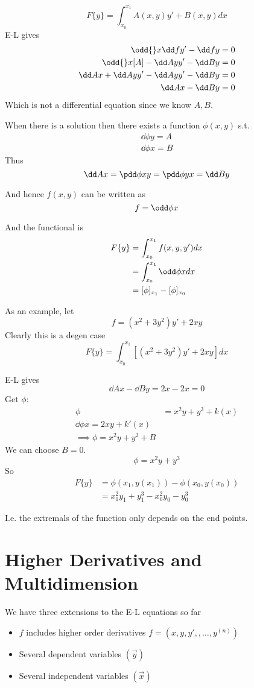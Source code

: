 \documentclass{E:/Documents/Latex/myassignment}
\begin{document}
\[F \{y\} = \int_{x_0}^{x_1} A(x,y) y' + B(x,y) dx\]
E-L gives
\begin{align*}
	\odd{}x \dd f{y'} - \dd fy = 0\\
	\odd{}x [A] - \dd Ay y'- \dd By =0\\
	\dd Ax + \dd Ay y' - \dd Ay y' - \dd By = 0\\
	\dd Ax - \dd By = 0
\end{align*}
Which is not a differential equation since we know $A, B$.


When there is a solution then there exists a function $\phi(x,y)$ s.t.
\begin{align*}
	\dd\phi y = A\\
	\dd\phi x = B
\end{align*}
Thus
\[\dd Ax = \pdd \phi xy = \pdd \phi yx = \dd By\]

And hence $f(x,y)$ can be written as
\[f = \odd \phi x\]

And the functional is
\begin{align*}
	F\{y\} &= \int_{x_0}^{x_1} f(x,y,y') dx\\
	&= \int_{x_0}^{x_1} \odd \phi x dx\\
	&= [\phi]_{x_1} - [\phi]_{x_0}
\end{align*}


As an example, let 
\[f = (x^2 + 3y^2)y' + 2xy\]
Clearly this is a degen case
\[F\{y\} = \int_{x_0}^{x_1} \left[(x^2 + 3y^2)y' + 2xy\right] dx\]

E-L gives
\[\dd Ax - \dd By = 2x - 2x = 0\]
Get $\phi$:
\begin{align*}
	\phi &= x^2y + y^3 + k(x)\\
	\dd \phi x = 2xy + k'(x)\\
	\implies \phi = x^2y + y^2 + B
\end{align*}
We can choose $B=0$.
\[\phi = x^2y + y^3\]
So
\begin{align*}
	F\{y\} &= \phi(x_1,y(x_1)) - \phi(x_0,y(x_0))\\
	&=	x_1^2 y_1 + y_1^3 - x_0^2 y_0 - y_0^3
\end{align*}


I.e. the extremals of the function only depends on the end points.

\section{Higher Derivatives and Multidimension}
We have three extensions to the E-L equations so far
\begin{itemize}
	\item $f$ includes higher order derivatives $f = (x,y,y',,\ldots,y^{(n)})$
	\item Several dependent variables $(\vec y)$
	\item Several independent variables $(\vec x)$
\end{itemize}
\end{document}
